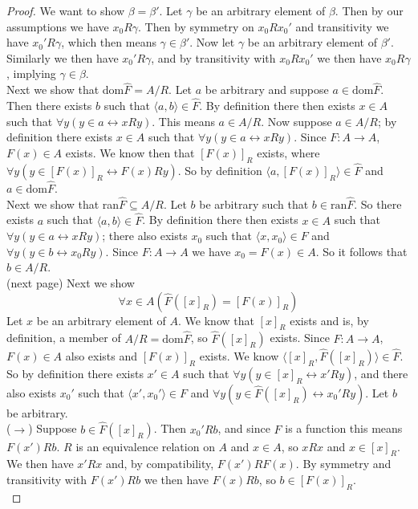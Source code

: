 \documentclass{report}
\begin{document}
\begin{proof}
We want to show $\beta=\beta'$. Let $\gamma$ be an arbitrary element of $\beta$. Then by our assumptions we have $x_0R\gamma$. Then by symmetry on $x_0Rx_0'$ and transitivity we have $x_0'R\gamma$,
which then means $\gamma\in\beta'$. Now let $\gamma$ be an arbitrary element of $\beta'$. Similarly we then have $x_0'R\gamma$, and by transitivity with $x_0Rx_0'$ we then have $x_0R\gamma$, 
implying $\gamma\in\beta$.\\
\indent Next we show that dom$\hat F=A/R$. Let $a$ be arbitrary and suppose $a\in\text{dom}\hat F$.
Then there exists $b$ such that $\langle a,b\rangle\in\hat F$. By definition there then exists $x\in A$ such that $\forall y(y\in a\leftrightarrow xRy)$. This means $a\in A/R$. Now suppose
$a\in A/R$; by definition there exists $x\in A$ such that $\forall y(y\in a\leftrightarrow xRy)$.
Since $F:A\to A$, $F(x)\in A$ exists. We know then that $[F(x)]_R$ exists, where
$\forall y(y\in [F(x)]_R\leftrightarrow F(x)Ry)$. So by definition $\langle a,[F(x)]_R\rangle\in\hat F$ and $a\in\text{dom}\hat F$.\\
\indent Next we show that ran$\hat F\subseteq A/R$. Let $b$ be arbitrary such that $b\in\text{ran}\hat F$. So there exists $a$ such that $\langle a,b\rangle\in\hat F$. By definition
there then exists $x\in A$ such that $\forall y(y\in a\leftrightarrow xRy)$; there also exists $x_0$ such that $\langle x,x_0\rangle\in F$ and $\forall y(y\in b\leftrightarrow x_0Ry)$. Since 
$F:A\to A$ we have $x_0=F(x)\in A$. So it follows that $b\in A/R$.\\
(next page)\newpage
Next we show 
\begin{equation*}
\forall x\in A(\hat F([x]_R)=[F(x)]_R)
\end{equation*}
Let $x$ be an arbitrary element of $A$. We know that $[x]_R$ exists and is, by definition, a member of $A/R=\text{dom}\hat F$, so $\hat F([x]_R)$ exists. Since $F:A\to A$, $F(x)\in A$ also exists 
and $[F(x)]_R$ exists. We know $\langle [x]_R,\hat F([x]_R)\rangle\in\hat F$. So by definition 
there exists $x'\in A$ such that $\forall y(y\in[x]_R\leftrightarrow x'Ry)$, and there also
exists $x_0'$ such that $\langle x',x_0'\rangle\in F$ and $\forall y(y\in\hat F([x]_R)\leftrightarrow x_0'Ry)$. Let $b$ be arbitrary.\\
\indent($\rightarrow$) Suppose $b\in\hat F([x]_R)$. Then $x_0'Rb$, and since $F$ is a function this means $F(x')Rb$. $R$ is an equivalence relation on $A$ and $x\in A$, so $xRx$ and $x\in[x]_R$.
We then have $x'Rx$ and, by compatibility, $F(x')RF(x)$. By symmetry and transitivity with $F(x')Rb$ we then have $F(x)Rb$, so $b\in[F(x)]_R$.\\

\end{proof}
\end{document}
